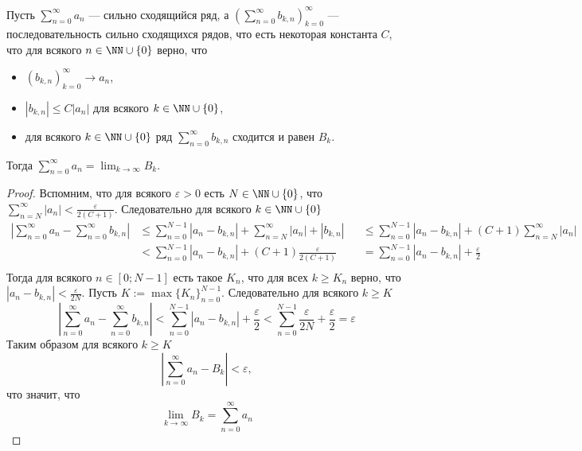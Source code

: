 \documentclass[12pt,a4paper]{article}
\begin{document}
    \begin{lemma}
        Пусть $\sum_{n=0}^\infty a_n$ --- сильно сходящийся ряд, а $(\sum_{n=0}^\infty b_{k,n})_{k=0}^\infty$ --- последовательность сильно сходящихся рядов, что есть некоторая константа $C$, что для всякого $n \in \NN \cup \{0\}$ верно, что
        \begin{itemize}
            \item $(b_{k, n})_{k=0}^\infty \to a_n$,
            \item $|b_{k, n}| \leqslant C |a_n|$ для всякого $k \in \NN \cup \{0\}$,
            \item для всякого $k \in \NN \cup \{0\}$ ряд $\sum_{n=0}^\infty b_{k,n}$ сходится и равен $B_k$.
        \end{itemize}
        Тогда $\sum_{n=0}^\infty a_n = \lim_{k \to \infty} B_k$.
    \end{lemma}

    \begin{proof}
        Вспомним, что для всякого $\varepsilon > 0$ есть $N \in \NN \cup \{0\}$, что $\sum_{n=N}^\infty |a_n| < \frac{\varepsilon}{2(C+1)}$. Следовательно для всякого $k \in \NN \cup \{0\}$
        \begin{align*}
            \left|\sum_{n=0}^\infty a_n - \sum_{n=0}^\infty b_{k, n}\right|
            &\leqslant \sum_{n=0}^{N-1} |a_n - b_{k,n}| + \sum_{n=N}^\infty |a_n| + |b_{k, n}|&
            &\leqslant \sum_{n=0}^{N-1} |a_n - b_{k,n}| + (C+1) \sum_{n=N}^\infty |a_n|\\
            &< \sum_{n=0}^{N-1} |a_n - b_{k,n}| + (C+1) \frac{\varepsilon}{2(C+1)}&
            &= \sum_{n=0}^{N-1} |a_n - b_{k,n}| + \frac{\varepsilon}{2}\\
        \end{align*}
        Тогда для всякого $n \in [0; N-1]$ есть такое $K_n$, что для всех $k \geqslant K_n$ верно, что $|a_n - b_{k, n}| < \frac{\varepsilon}{2N}$. Пусть $K := \max\{K_n\}_{n=0}^{N-1}$. Следовательно для всякого $k \geqslant K$
        \[
            \left|\sum_{n=0}^\infty a_n - \sum_{n=0}^\infty b_{k, n}\right|
            < \sum_{n=0}^{N-1} |a_n - b_{k,n}| + \frac{\varepsilon}{2}
            < \sum_{n=0}^{N-1} \frac{\varepsilon}{2N} + \frac{\varepsilon}{2}
            = \varepsilon
        \]
        Таким образом для всякого $k \geqslant K$
        \[\left|\sum_{n=0}^\infty a_n - B_k\right| < \varepsilon,\]
        что значит, что
        \[\lim_{k \to \infty} B_k = \sum_{n=0}^\infty a_n\]
    \end{proof}
\end{document}

